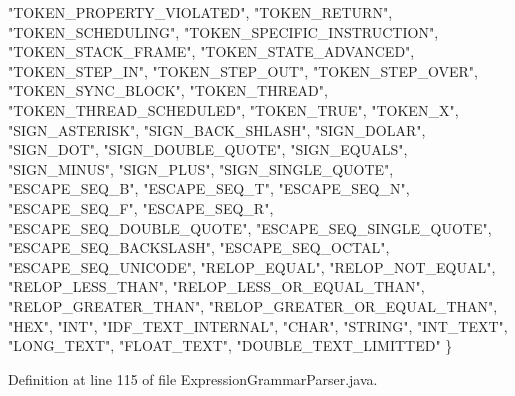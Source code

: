 \begin{DoxyCode}
    \textcolor{stringliteral}{"TOKEN\_PROPERTY\_VIOLATED"}, \textcolor{stringliteral}{"TOKEN\_RETURN"}, \textcolor{stringliteral}{"TOKEN\_SCHEDULING"}, \textcolor{stringliteral}{"TOKEN\_SPECIFIC\_INSTRUCTION"}, 
    \textcolor{stringliteral}{"TOKEN\_STACK\_FRAME"}, \textcolor{stringliteral}{"TOKEN\_STATE\_ADVANCED"}, \textcolor{stringliteral}{"TOKEN\_STEP\_IN"}, \textcolor{stringliteral}{"TOKEN\_STEP\_OUT"}, 
    \textcolor{stringliteral}{"TOKEN\_STEP\_OVER"}, \textcolor{stringliteral}{"TOKEN\_SYNC\_BLOCK"}, \textcolor{stringliteral}{"TOKEN\_THREAD"}, \textcolor{stringliteral}{"TOKEN\_THREAD\_SCHEDULED"}, 
    \textcolor{stringliteral}{"TOKEN\_TRUE"}, \textcolor{stringliteral}{"TOKEN\_X"}, \textcolor{stringliteral}{"SIGN\_ASTERISK"}, \textcolor{stringliteral}{"SIGN\_BACK\_SHLASH"}, \textcolor{stringliteral}{"SIGN\_DOLAR"}, 
    \textcolor{stringliteral}{"SIGN\_DOT"}, \textcolor{stringliteral}{"SIGN\_DOUBLE\_QUOTE"}, \textcolor{stringliteral}{"SIGN\_EQUALS"}, \textcolor{stringliteral}{"SIGN\_MINUS"}, \textcolor{stringliteral}{"SIGN\_PLUS"}, 
    \textcolor{stringliteral}{"SIGN\_SINGLE\_QUOTE"}, \textcolor{stringliteral}{"ESCAPE\_SEQ\_B"}, \textcolor{stringliteral}{"ESCAPE\_SEQ\_T"}, \textcolor{stringliteral}{"ESCAPE\_SEQ\_N"}, \textcolor{stringliteral}{"ESCAPE\_SEQ\_F"}, 
    \textcolor{stringliteral}{"ESCAPE\_SEQ\_R"}, \textcolor{stringliteral}{"ESCAPE\_SEQ\_DOUBLE\_QUOTE"}, \textcolor{stringliteral}{"ESCAPE\_SEQ\_SINGLE\_QUOTE"}, 
    \textcolor{stringliteral}{"ESCAPE\_SEQ\_BACKSLASH"}, \textcolor{stringliteral}{"ESCAPE\_SEQ\_OCTAL"}, \textcolor{stringliteral}{"ESCAPE\_SEQ\_UNICODE"}, \textcolor{stringliteral}{"RELOP\_EQUAL"}, 
    \textcolor{stringliteral}{"RELOP\_NOT\_EQUAL"}, \textcolor{stringliteral}{"RELOP\_LESS\_THAN"}, \textcolor{stringliteral}{"RELOP\_LESS\_OR\_EQUAL\_THAN"}, \textcolor{stringliteral}{"RELOP\_GREATER\_THAN"}, 
    \textcolor{stringliteral}{"RELOP\_GREATER\_OR\_EQUAL\_THAN"}, \textcolor{stringliteral}{"HEX"}, \textcolor{stringliteral}{"INT"}, \textcolor{stringliteral}{"IDF\_TEXT\_INTERNAL"}, \textcolor{stringliteral}{"CHAR"}, 
    \textcolor{stringliteral}{"STRING"}, \textcolor{stringliteral}{"INT\_TEXT"}, \textcolor{stringliteral}{"LONG\_TEXT"}, \textcolor{stringliteral}{"FLOAT\_TEXT"}, \textcolor{stringliteral}{"DOUBLE\_TEXT\_LIMITTED"}
  \}
\end{DoxyCode}


Definition at line 115 of file Expression\+Grammar\+Parser.\+java.

